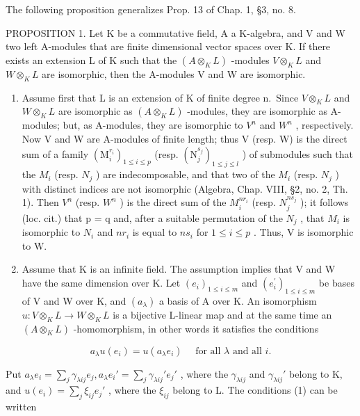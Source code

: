 
The following proposition generalizes Prop. 13 of Chap. 1, §3, no. 8.

PROPOSITION 1. Let K be a commutative field, A a K-algebra, and V and W two left A-modules that are finite dimensional vector spaces over K. If there exists an extension L of K such that the \((A \otimes_{K} L)\) -modules \(V \otimes_{K} L\) and \(W \otimes_{K} L\) are isomorphic, then the A-modules V and W are isomorphic.

\begin{enumerate}
\def\labelenumi{\alph{enumi})}
\item
  Assume first that L is an extension of K of finite degree n.~Since \(V \otimes_{K} L\) and \(W \otimes_{K} L\) are isomorphic as \((A \otimes_{K} L)\) -modules, they are isomorphic as A-modules; but, as A-modules, they are isomorphic to \(V^{n}\) and \(W^{n}\) , respectively. Now V and W are A-modules of finite length; thus V (resp. W) is the direct sum of a family \((\mathrm{M}_{i}^{r_{i}})_{1 \leqslant i \leqslant p}\) (resp. \((\mathrm{N}_{j}^{s_{j}})_{1 \leqslant j \leqslant l}\) ) of submodules such that the \(M_{i}\) (resp. \(N_{j}\) ) are indecomposable, and that two of the \(M_{i}\) (resp. \(N_{j}\) ) with distinct indices are not isomorphic (Algebra, Chap. VIII, §2, no. 2, Th. 1). Then \(V^{n}\) (resp. \(W^{n}\) ) is the direct sum of the \(M_{i}^{nr_{i}}\) (resp. \(N_{j}^{ns_{j}}\) ); it follows (loc. cit.) that p = q and, after a suitable permutation of the \(N_{j}\) , that \(M_{i}\) is isomorphic to \(N_{i}\) and \(nr_{i}\) is equal to \(ns_{i}\) for \(1 \leqslant i \leqslant p\) . Thus, V is isomorphic to W.
\item
  Assume that K is an infinite field. The assumption implies that V and W have the same dimension over K. Let \((e_{i})_{1\leqslant i\leqslant m}\) and \((e_{i}^{\prime})_{1\leqslant i\leqslant m}\) be bases of V and W over K, and \((a_{\lambda})\) a basis of A over K. An isomorphism \(u:V\otimes_{K}L\to W\otimes_{K}L\) is a bijective L-linear map and at the same time an \((A\otimes_{K}L)\) -homomorphism, in other words it satisfies the conditions
\end{enumerate}

\[
a _ {\lambda} u \left(e _ {i}\right) = u \left(a _ {\lambda} e _ {i}\right) \quad \text { for   all } \lambda \text { and   all } i.\tag{1}
\]

Put \(a_{\lambda}e_{i} = \sum_{j}\gamma_{\lambda ij}e_{j}, a_{\lambda}e_{i}' = \sum_{j}\gamma_{\lambda ij}'e_{j}'\) , where the \(\gamma_{\lambda ij}\) and \(\gamma_{\lambda ij}'\) belong to K, and \(u(e_i) = \sum_{j}\xi_{ij}e_j'\) , where the \(\xi_{ij}\) belong to L. The conditions (1) can be written

